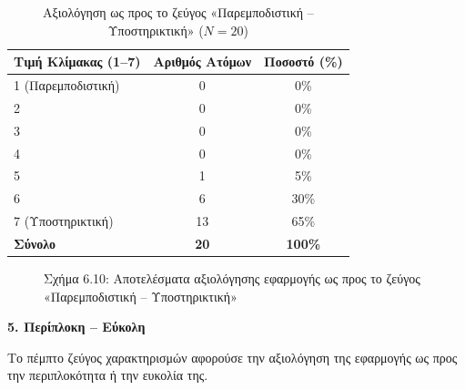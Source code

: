 \documentclass[twoside, a4paper, 11pt]{article}
\begin{document}
\begin{table}[H]
    \centering
    \caption{Αξιολόγηση ως προς το ζεύγος «Παρεμποδιστική – Υποστηρικτική» ($N = 20$)}
    \begin{tabular}{|l|c|c|}
        \hline
        \textbf{Τιμή Κλίμακας (1–7)} & \textbf{Αριθμός Ατόμων} & \textbf{Ποσοστό (\%)} \\ \hline
        1 (Παρεμποδιστική) & 0 & 0\% \\ \hline
        2 & 0 & 0\% \\ \hline
        3 & 0 & 0\% \\ \hline
        4 & 0 & 0\% \\ \hline
        5 & 1 & 5\% \\ \hline
        6 & 6 & 30\% \\ \hline
        7 (Υποστηρικτική) & 13 & 65\% \\ \hline
        \textbf{Σύνολο} & \textbf{20} & \textbf{100\%} \\ \hline
    \end{tabular}
\end{table}

\begin{figure}[H]
    \centering
    \caption{Σχήμα 6.10: Αποτελέσματα αξιολόγησης εφαρμογής ως προς το ζεύγος «Παρεμποδιστική – Υποστηρικτική»}
\end{figure}

\vspace{1em}
\noindent\textbf{5. Περίπλοκη – Εύκολη}

Το πέμπτο ζεύγος χαρακτηρισμών αφορούσε την αξιολόγηση της εφαρμογής ως προς την περιπλοκότητα ή την ευκολία της.
\end{document}
